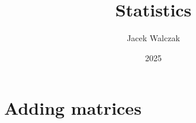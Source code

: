 \documentclass{article}
\title{Statistics}
\author{Jacek Walczak}
\date{2025}
\begin{document}
\maketitle

\section{Adding matrices}
\end{document}
